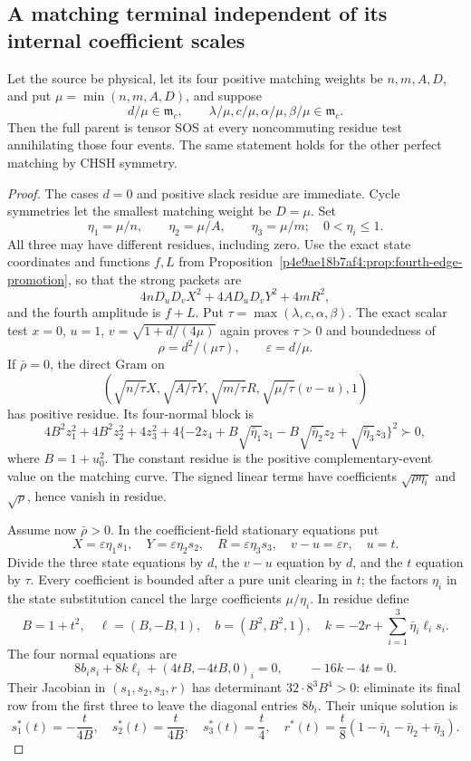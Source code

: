 \subsection{A matching terminal independent of its internal coefficient scales}
\begin{theorem}\label{pa2cbe6ecbeb4:thm:matching-flag-terminal}
Let the source be physical, let its four positive matching weights be $n,m,A,D$, and put
$\mu=\min(n,m,A,D)$, and suppose
\[
d/\mu\in\mathfrak m_c,\qquad
\lambda/\mu,c/\mu,\alpha/\mu,\beta/\mu\in\mathfrak m_c.
\]
Then the full parent is tensor SOS at every noncommuting residue test annihilating those four events. The same statement holds for the other perfect matching by CHSH symmetry.
\end{theorem}
\begin{proof}
The cases $d=0$ and positive slack residue are immediate. Cycle symmetries let the smallest matching weight be $D=\mu$. Set
\[
\eta_1=\mu/n,\qquad\eta_2=\mu/A,\qquad\eta_3=\mu/m;
\quad 0<\eta_i\le1.
\]
All three may have different residues, including zero. Use the exact state coordinates and functions $f,L$ from Proposition~\ref{p4e9ae18b7af4:prop:fourth-edge-promotion}, so that the strong packets are
\[
4nD_uD_vX^2+4AD_uD_vY^2+4mR^2,
\]
and the fourth amplitude is $f+L$. Put $\tau=\max(\lambda,c,\alpha,\beta)$. The exact scalar test $x=0$, $u=1$, $v=\sqrt{1+d/(4\mu)}$ again proves $\tau>0$ and boundedness of
\[
\rho=d^2/(\mu\tau),\qquad \varepsilon=d/\mu.
\]
If $\bar\rho=0$, the direct Gram on
\[
\left(\sqrt{n/\tau}X,\sqrt{A/\tau}Y,\sqrt{m/\tau}R,
\sqrt{\mu/\tau}(v-u),1\right)
\]
has positive residue. Its four-normal block is
\[
4B^2z_1^2+4B^2z_2^2+4z_3^2+
4\{-2z_4+B\sqrt{\bar\eta_1}z_1
 -B\sqrt{\bar\eta_2}z_2+\sqrt{\bar\eta_3}z_3\}^2\succ0,
\]
where $B=1+u_0^2$. The constant residue is the positive complementary-event value on the matching curve. The signed linear terms have coefficients $\sqrt{\rho\eta_i}$ and $\sqrt\rho$, hence vanish in residue.

Assume now $\bar\rho>0$. In the coefficient-field stationary equations put
\[
X=\varepsilon\eta_1s_1,\quad
Y=\varepsilon\eta_2s_2,\quad
R=\varepsilon\eta_3s_3,\quad
v-u=\varepsilon r,\quad u=t.
\]
Divide the three state equations by $d$, the $v-u$ equation by $d$, and the $t$ equation by $\tau$. Every coefficient is bounded after a pure unit clearing in $t$; the factors $\eta_i$ in the state substitution cancel the large coefficients $\mu/\eta_i$. In residue define
\[
B=1+t^2,\quad \ell=(B,-B,1),\quad
b=(B^2,B^2,1),\quad
k=-2r+\sum_{i=1}^3\bar\eta_i\ell_i s_i.
\]
The four normal equations are
\[
8b_i s_i+8k\ell_i+(4tB,-4tB,0)_i=0,
\qquad -16k-4t=0.
\]
Their Jacobian in $(s_1,s_2,s_3,r)$ has determinant
$32\cdot8^3B^4>0$: eliminate its final row from the first three to leave the diagonal entries $8b_i$. Their unique solution is
\[
s_1^*(t)=-\frac{t}{4B},\quad
s_2^*(t)=\frac{t}{4B},\quad
s_3^*(t)=\frac t4,\quad
r^*(t)=\frac t8(1-\bar\eta_1-\bar\eta_2+\bar\eta_3).
\]


\end{proof}
